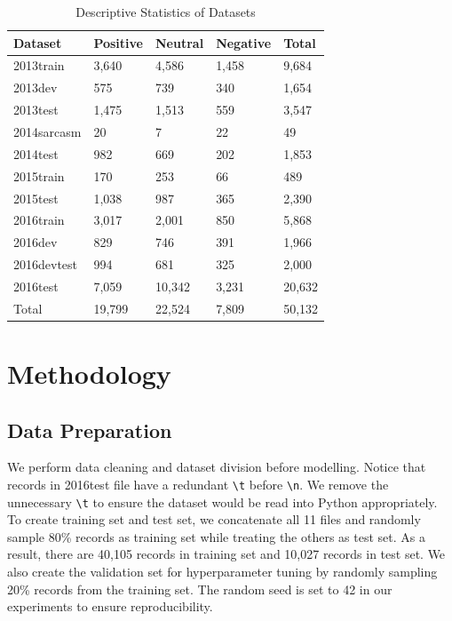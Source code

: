 \documentclass[runningheads]{llncs}
\begin{document}
\begin{table}[!ht]
	\centering
	\caption{Descriptive Statistics of Datasets} 
    \label{tab:3-stat}
	\begin{tabular}{lllll}
		\toprule
        \textbf{Dataset} & \textbf{Positive} & \textbf{Neutral} & \textbf{Negative} & \textbf{Total}\\ 
        \midrule
		2013train   & 3,640     & 4,586    & 1,458     & 9,684  \\
		2013dev     & 575      & 739     & 340      & 1,654  \\
		2013test    & 1,475     & 1,513    & 559      & 3,547  \\
		2014sarcasm & 20       & 7       & 22       & 49    \\
		2014test    & 982      & 669     & 202      & 1,853  \\
		2015train   & 170      & 253     & 66       & 489   \\
		2015test    & 1,038     & 987     & 365      & 2,390 \\
		2016train   & 3,017     & 2,001    & 850      & 5,868  \\
		2016dev     & 829      & 746     & 391      & 1,966  \\
		2016devtest & 994      & 681     & 325      & 2,000  \\
		2016test    & 7,059     & 10,342   & 3,231     & 20,632 \\ 
        \midrule
        Total   & 19,799  & 22,524  & 7,809  &   50,132\\
        \bottomrule
	\end{tabular}
\end{table}

\section{Methodology} \label{sec:method}
\subsection{Data Preparation}
We perform data cleaning and dataset division before modelling. Notice that records in 2016test file have a redundant \texttt{\textbackslash t} before \texttt{\textbackslash n}. We remove the unnecessary \texttt{\textbackslash t} to ensure the dataset would be read into Python appropriately. To create training set and test set, we concatenate all 11 files and randomly sample 80\% records as training set while treating the others as test set. As a result, there are 40,105 records in training set and 10,027 records in test set. We also create the validation set for hyperparameter tuning by randomly sampling 20\% records from the training set. The random seed is set to 42 in our experiments to ensure reproducibility.
\end{document}
